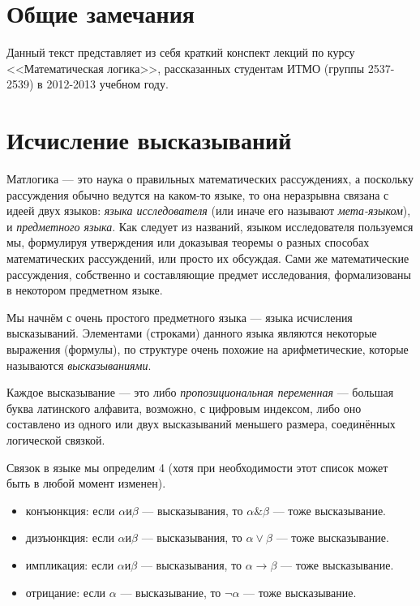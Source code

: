 \section{Общие замечания}

Данный текст представляет из себя краткий конспект лекций по курсу
<<Математическая логика>>, рассказанных студентам ИТМО (группы 2537-2539)
в 2012-2013 учебном году.

\section{Исчисление высказываний}

Матлогика --- это наука о правильных математических рассуждениях, а поскольку
рассуждения обычно ведутся на каком-то языке, то она неразрывна связана с идеей
двух языков: \emph{языка исследователя} (или иначе его называют \emph{мета-языком}),
и \emph{предметного языка}. Как следует из названий, языком исследователя 
пользуемся мы, формулируя утверждения или доказывая теоремы о разных способах
математических рассуждений, или просто их обсуждая. Сами же математические рассуждения,
собственно и составляющие предмет исследования, формализованы в некотором предметном 
языке.

Мы начнём с очень простого предметного языка --- языка исчисления высказываний.
Элементами (строками) данного языка являются некоторые выражения (формулы), по структуре
очень похожие на арифметические, которые называются \emph{высказываниями}.

Каждое высказывание --- это либо \emph{пропозициональная переменная} --- 
большая буква латинского алфавита, возможно, с цифровым индексом, либо 
оно составлено из одного или двух высказываний меньшего размера, соединённых логической связкой.

Связок в языке мы определим 4 (хотя при необходимости этот список может быть
в любой момент изменен).
\begin{itemize}
\item конъюнкция: если $\alpha и \beta$ --- высказывания, то $\alpha \& \beta$ --- тоже высказывание.
\item дизъюнкция: если $\alpha и \beta$ --- высказывания, то $\alpha \vee \beta$ --- тоже высказывание.
\item импликация: если $\alpha и \beta$ --- высказывания, то $\alpha \rightarrow \beta$ --- тоже высказывание.
\item отрицание: если $\alpha$ --- высказывание, то $\neg\alpha$ --- тоже высказывание.
\end{itemize}

